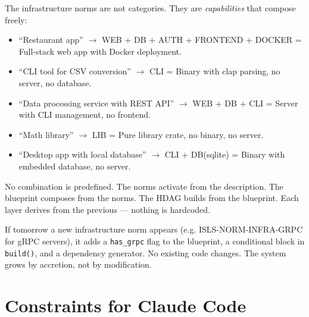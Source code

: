 \documentclass[11pt,a4paper]{article}
\begin{document}
The infrastructure norms are not categories. They are \emph{capabilities}
that compose freely:

\begin{itemize}[nosep]
\item ``Restaurant app'' $\to$ WEB + DB + AUTH + FRONTEND + DOCKER 
      = Full-stack web app with Docker deployment.
\item ``CLI tool for CSV conversion'' $\to$ CLI = Binary with clap 
      parsing, no server, no database.
\item ``Data processing service with REST API'' $\to$ WEB + DB + CLI 
      = Server with CLI management, no frontend.
\item ``Math library'' $\to$ LIB = Pure library crate, no binary, 
      no server.
\item ``Desktop app with local database'' $\to$ CLI + DB(sqlite) 
      = Binary with embedded database, no server.
\end{itemize}

No combination is predefined. The norms activate from the description.
The blueprint composes from the norms. The HDAG builds from the 
blueprint. Each layer derives from the previous --- nothing is
hardcoded.

If tomorrow a new infrastructure norm appears (e.g. 
ISLS-NORM-INFRA-GRPC for gRPC servers), it adds a 
\texttt{has\_grpc} flag to the blueprint, a conditional block in 
\texttt{build()}, and a dependency generator. No existing code changes.
The system grows by accretion, not by modification.


\section{Constraints for Claude Code}
\end{document}
